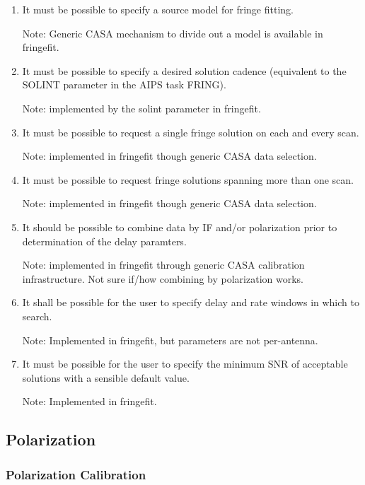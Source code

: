 \documentclass[11pt,a4paper]{article}
\begin{document}
\begin{enumerate}[subsubseclist]

\item It must be possible to specify a source model for fringe fitting.

  Note: Generic CASA mechanism to divide out a model is available in
  fringefit.

\item It must be possible to specify a desired solution cadence
  (equivalent to the SOLINT parameter in the AIPS task FRING).

  Note: implemented by the solint parameter in fringefit.

\item It must be possible to request a single fringe solution on each
  and every scan.

  Note: implemented in fringefit though generic CASA data selection.

\item It must be possible to request fringe solutions spanning more
  than one scan.

  Note: implemented in fringefit though generic CASA data selection.

\item It should be possible to combine data by IF and/or polarization
  prior to determination of the delay paramters.

  Note: implemented in fringefit through generic CASA calibration
  infrastructure.  Not sure if/how combining by polarization works.

\item It shall be possible for the user to specify delay and rate
  windows in which to search.

  Note: Implemented in fringefit, but parameters are not per-antenna.

\item It must be possible for the user to specify the minimum SNR of
  acceptable solutions with a sensible default value.

  Note: Implemented in fringefit.

\end{enumerate}

\subsection{Polarization}

\subsubsection{Polarization Calibration}
\end{document}
